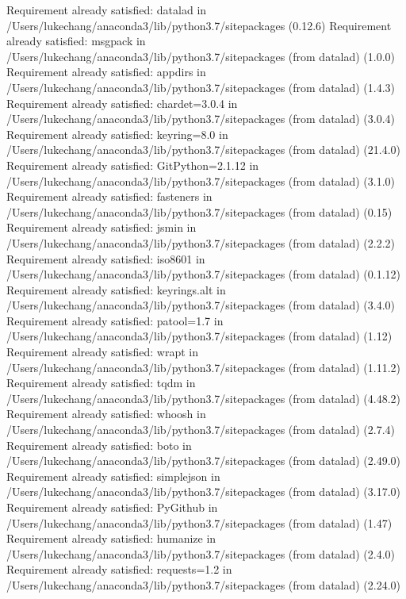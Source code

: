 \documentclass[letterpaper,10pt,english]{sphinxmanual}
\begin{document}
\begin{sphinxVerbatim}[commandchars=\\\{\}]
Requirement already satisfied: datalad in /Users/lukechang/anaconda3/lib/python3.7/site\PYGZhy{}packages (0.12.6)
Requirement already satisfied: msgpack in /Users/lukechang/anaconda3/lib/python3.7/site\PYGZhy{}packages (from datalad) (1.0.0)
Requirement already satisfied: appdirs in /Users/lukechang/anaconda3/lib/python3.7/site\PYGZhy{}packages (from datalad) (1.4.3)
Requirement already satisfied: chardet\PYGZgt{}=3.0.4 in /Users/lukechang/anaconda3/lib/python3.7/site\PYGZhy{}packages (from datalad) (3.0.4)
Requirement already satisfied: keyring\PYGZgt{}=8.0 in /Users/lukechang/anaconda3/lib/python3.7/site\PYGZhy{}packages (from datalad) (21.4.0)
Requirement already satisfied: GitPython\PYGZgt{}=2.1.12 in /Users/lukechang/anaconda3/lib/python3.7/site\PYGZhy{}packages (from datalad) (3.1.0)
Requirement already satisfied: fasteners in /Users/lukechang/anaconda3/lib/python3.7/site\PYGZhy{}packages (from datalad) (0.15)
Requirement already satisfied: jsmin in /Users/lukechang/anaconda3/lib/python3.7/site\PYGZhy{}packages (from datalad) (2.2.2)
Requirement already satisfied: iso8601 in /Users/lukechang/anaconda3/lib/python3.7/site\PYGZhy{}packages (from datalad) (0.1.12)
Requirement already satisfied: keyrings.alt in /Users/lukechang/anaconda3/lib/python3.7/site\PYGZhy{}packages (from datalad) (3.4.0)
Requirement already satisfied: patool\PYGZgt{}=1.7 in /Users/lukechang/anaconda3/lib/python3.7/site\PYGZhy{}packages (from datalad) (1.12)
Requirement already satisfied: wrapt in /Users/lukechang/anaconda3/lib/python3.7/site\PYGZhy{}packages (from datalad) (1.11.2)
Requirement already satisfied: tqdm in /Users/lukechang/anaconda3/lib/python3.7/site\PYGZhy{}packages (from datalad) (4.48.2)
Requirement already satisfied: whoosh in /Users/lukechang/anaconda3/lib/python3.7/site\PYGZhy{}packages (from datalad) (2.7.4)
Requirement already satisfied: boto in /Users/lukechang/anaconda3/lib/python3.7/site\PYGZhy{}packages (from datalad) (2.49.0)
Requirement already satisfied: simplejson in /Users/lukechang/anaconda3/lib/python3.7/site\PYGZhy{}packages (from datalad) (3.17.0)
Requirement already satisfied: PyGithub in /Users/lukechang/anaconda3/lib/python3.7/site\PYGZhy{}packages (from datalad) (1.47)
Requirement already satisfied: humanize in /Users/lukechang/anaconda3/lib/python3.7/site\PYGZhy{}packages (from datalad) (2.4.0)
Requirement already satisfied: requests\PYGZgt{}=1.2 in /Users/lukechang/anaconda3/lib/python3.7/site\PYGZhy{}packages (from datalad) (2.24.0)

\end{sphinxVerbatim}
\end{document}
